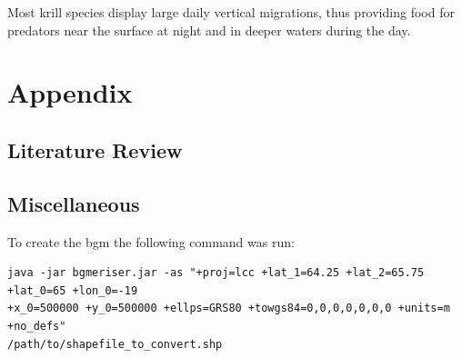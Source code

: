 \documentclass{report}
\begin{document}
Most krill species display large daily vertical migrations, thus providing food for predators near the surface at night and in deeper waters during the day.

\printbibliography[heading=bibintoc]

\chapter{Appendix}

\section{Literature Review}

\section{Miscellaneous}

To create the bgm the following command was run:

\begin{verbatim}
java -jar bgmeriser.jar -as "+proj=lcc +lat_1=64.25 +lat_2=65.75 +lat_0=65 +lon_0=-19 
+x_0=500000 +y_0=500000 +ellps=GRS80 +towgs84=0,0,0,0,0,0,0 +units=m +no_defs"
/path/to/shapefile_to_convert.shp
\end{verbatim}
\end{document}
